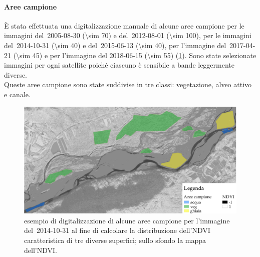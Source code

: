 \paragraph{Aree campione}
\`{E} stata effettuata una digitalizzazione manuale di alcune aree campione per le immagini \AST{} del~2005-08-30 (\num{\sim 70}) e del~2012-08-01 (\num{\sim 100}), per le immagini \Pl{} del~2014-10-31 (\num{\sim 40}) e del~2015-06-13 (\num{\sim 40}), per l'immagine \Se{} del~2017-04-21 (\num{\sim 45}) e per l'immagine \WV{} del 2018-06-15 (\num{\sim 55}) (\cref{fig:esempio-aree-campione}).
	Sono state selezionate immagini per ogni satellite poiché ciascuno è sensibile a bande leggermente diverse. 
	\\
	Queste aree campione sono state suddivise in tre classi: vegetazione, alveo attivo e canale.
	\begin{figure}
		\centering
		\includegraphics[width=\textwidth]{files/esempio_aree_campione_2014_10_31.jpeg}
		\caption[esempio di aree campione per calcolare la distribuzione dell'NDVI]{esempio di digitalizzazione di alcune aree campione per l'immagine \Pl{} del~2014-10-31 al fine di calcolare la distribuzione dell'NDVI caratteristica di tre diverse superfici; sullo sfondo la mappa dell'NDVI.}
		\label{fig:esempio-aree-campione}
	\end{figure}
